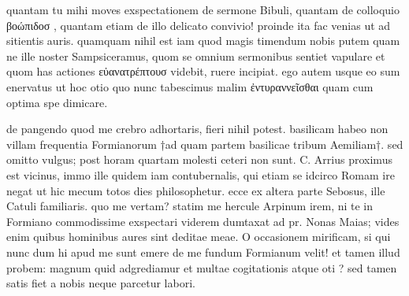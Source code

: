 


 quantam tu mihi moves exspectationem de sermone Bibuli, quantam de colloquio βοώπιδοσ , quantam etiam de illo delicato convivio! proinde ita fac venias ut ad sitientis auris. quamquam nihil est iam quod magis timendum nobis putem quam ne ille noster Sampsiceramus, quom se omnium sermonibus sentiet vapulare et quom has actiones εὐανατρέπτουσ videbit, ruere incipiat. ego autem usque eo sum enervatus ut hoc otio quo nunc tabescimus malim ἐντυραννεῖσθαι quam cum optima spe dimicare.

 de pangendo quod me crebro adhortaris, fieri nihil potest. basilicam habeo non villam frequentia Formianorum †ad quam partem basilicae tribum Aemiliam†. sed omitto vulgus; post horam quartam molesti ceteri non sunt. C. Arrius proximus est vicinus, immo ille quidem iam contubernalis, qui etiam se idcirco Romam ire negat ut hic mecum totos dies philosophetur. ecce ex altera parte Sebosus, ille Catuli familiaris. quo me vertam? statim me hercule Arpinum irem, ni te in Formiano commodissime exspectari viderem dumtaxat ad pr. Nonas Maias; vides enim quibus hominibus aures sint deditae meae. O occasionem mirificam, si qui nunc dum hi apud me sunt emere de me fundum Formianum velit! et tamen illud probem: magnum quid adgrediamur et multae cogitationis atque oti ? sed tamen satis fiet a nobis neque parcetur labori.
